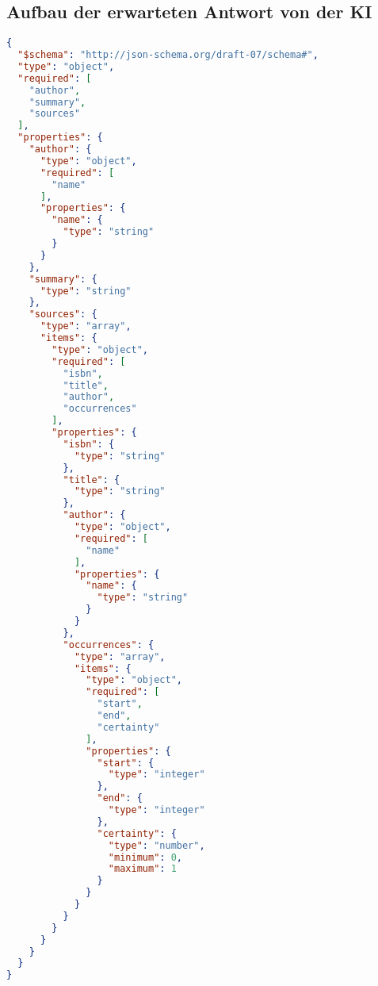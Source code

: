 \subsection*{Aufbau der erwarteten Antwort von der KI}\label{subsec:ki-antwort}
\begin{lstlisting}[caption={Erwartetes Format der KI-Antwort},captionpos=b,label={lst:ki-antwort}, language=json]
{
  "$schema": "http://json-schema.org/draft-07/schema#",
  "type": "object",
  "required": [
    "author",
    "summary",
    "sources"
  ],
  "properties": {
    "author": {
      "type": "object",
      "required": [
        "name"
      ],
      "properties": {
        "name": {
          "type": "string"
        }
      }
    },
    "summary": {
      "type": "string"
    },
    "sources": {
      "type": "array",
      "items": {
        "type": "object",
        "required": [
          "isbn",
          "title",
          "author",
          "occurrences"
        ],
        "properties": {
          "isbn": {
            "type": "string"
          },
          "title": {
            "type": "string"
          },
          "author": {
            "type": "object",
            "required": [
              "name"
            ],
            "properties": {
              "name": {
                "type": "string"
              }
            }
          },
          "occurrences": {
            "type": "array",
            "items": {
              "type": "object",
              "required": [
                "start",
                "end",
                "certainty"
              ],
              "properties": {
                "start": {
                  "type": "integer"
                },
                "end": {
                  "type": "integer"
                },
                "certainty": {
                  "type": "number",
                  "minimum": 0,
                  "maximum": 1
                }
              }
            }
          }
        }
      }
    }
  }
}
\end{lstlisting}

